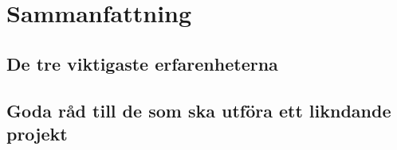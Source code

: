
\section{Sammanfattning}

\subsection{De tre viktigaste erfarenheterna}

\subsection{Goda råd till de som ska utföra ett likndande projekt}
